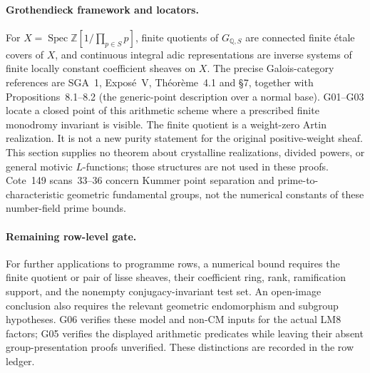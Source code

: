 \paragraph{Grothendieck framework and locators.}
For $X=\operatorname{Spec}\mathbb Z[1/\prod_{p\in S}p]$, finite quotients of $G_{\mathbb Q,S}$ are connected finite \'etale covers of $X$, and continuous integral adic representations are inverse systems of finite locally constant coefficient sheaves on $X$. The precise Galois-category references are SGA~1, Expos\'e~V, Th\'eor\`eme~4.1 and \S7, together with Propositions~8.1--8.2 (the generic-point description over a normal base). G01--G03 locate a closed point of this arithmetic scheme where a prescribed finite monodromy invariant is visible.  The finite quotient is a weight-zero Artin realization.  It is not a new purity statement for the original positive-weight sheaf.  This section supplies no theorem about crystalline realizations, divided powers, or general motivic $L$-functions; those structures are not used in these proofs.  Cote~149 scans~33--36 concern Kummer point separation and prime-to-characteristic geometric fundamental groups, not the numerical constants of these number-field prime bounds.

\paragraph{Remaining row-level gate.}
For further applications to programme rows, a numerical bound requires the finite quotient or pair of lisse sheaves, their coefficient ring, rank, ramification support, and the nonempty conjugacy-invariant test set. An open-image conclusion also requires the relevant geometric endomorphism and subgroup hypotheses. G06 verifies these model and non-CM inputs for the actual LM8 factors; G05 verifies the displayed arithmetic predicates while leaving their absent group-presentation proofs unverified. These distinctions are recorded in the row ledger.
